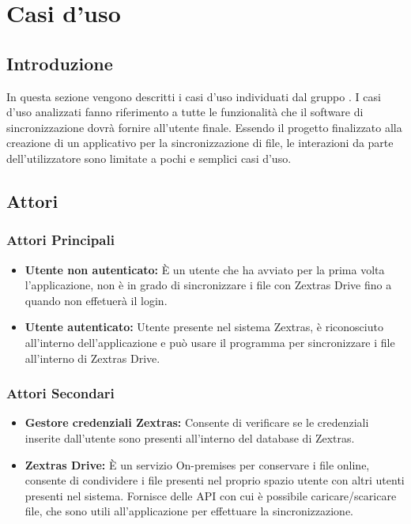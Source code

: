 \section{Casi d'uso}
\subsection{Introduzione}
In questa sezione vengono descritti i casi d'uso individuati dal gruppo \gruppo{}.
I casi d'uso analizzati fanno riferimento a tutte le funzionalità che il software di sincronizzazione dovrà fornire all'utente finale.\newline
Essendo il progetto finalizzato alla creazione di un applicativo per la sincronizzazione di file, le interazioni da parte dell'utilizzatore sono limitate a pochi e semplici casi d'uso.

\subsection{Attori}

\subsubsection{Attori Principali}
\begin{itemize}
\item \textbf{Utente non autenticato:} È un utente che ha avviato per la prima volta l'applicazione, non è in grado di sincronizzare i file con Zextras Drive fino a quando non effetuerà il login.
\item \textbf{Utente autenticato:} Utente presente nel sistema Zextras, è riconosciuto all'interno dell'applicazione e può usare il programma per sincronizzare i file all'interno di Zextras Drive.
\end{itemize}

\subsubsection{Attori Secondari}
\begin{itemize}
\item \textbf{Gestore credenziali Zextras:} Consente di verificare se le credenziali inserite dall'utente sono presenti all'interno del database di Zextras.
\item \textbf{Zextras Drive:} È un servizio On-premises per conservare i file online, consente di condividere i file presenti nel proprio spazio utente con altri utenti presenti nel sistema. Fornisce delle API con cui è possibile caricare/scaricare file, che sono utili all'applicazione per effettuare la sincronizzazione.
\end{itemize}

